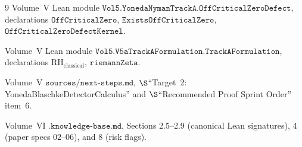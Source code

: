 \documentclass[12pt]{article}
\theoremstyle{plain}
\theoremstyle{definition}
\theoremstyle{remark}
\begin{document}
\begin{thebibliography}{9}
Volume~V Lean module
\(\mathtt{Vol5.YonedaNymanTrackA.OffCriticalZeroDefect}\), declarations
\(\mathtt{OffCriticalZero}\), \(\mathtt{ExistsOffCriticalZero}\),
\(\mathtt{OffCriticalZeroDefectKernel}\).

Volume~V Lean module
\(\mathtt{Vol5.V5aTrackAFormulation.TrackAFormulation}\), declarations
\(\mathrm{RH}_{\mathrm{classical}}\), \(\mathtt{riemannZeta}\).

Volume~V \(\mathtt{sources/next\text{-}steps.md}\),
\(\S\)``Target~2: YonedaBlaschkeDetectorCalculus'' and
\(\S\)``Recommended Proof Sprint Order'' item~6.

Volume~VI \(\mathtt{.knowledge\text{-}base.md}\), Sections 2.5--2.9
(canonical Lean signatures), 4 (paper specs 02--06), and 8 (risk
flags).

\end{thebibliography}
\end{document}
